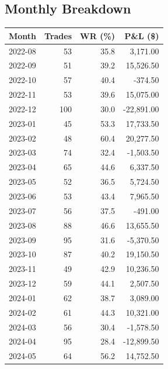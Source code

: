\documentclass[11pt,a4paper,twoside]{article}
\begin{document}
\subsection{Monthly Breakdown}
\noindent\begin{center}
\begin{tabular}{>{\color{txtmain}}l rrr}
\toprule
\rowcolor{cardbg}
\textbf{Month} & \textbf{Trades} & \textbf{WR (\%)} & \textbf{P\&L (\$)} \\
\midrule
2022-08 & 53 & 35.8 & \textcolor{wingreen}{3,171.00} \\
2022-09 & 51 & 39.2 & \textcolor{wingreen}{15,526.50} \\
2022-10 & 57 & 40.4 & \textcolor{lossred}{-374.50} \\
2022-11 & 53 & 39.6 & \textcolor{wingreen}{15,075.00} \\
2022-12 & 100 & 30.0 & \textcolor{lossred}{-22,891.00} \\
2023-01 & 45 & 53.3 & \textcolor{wingreen}{17,733.50} \\
2023-02 & 48 & 60.4 & \textcolor{wingreen}{20,277.50} \\
2023-03 & 74 & 32.4 & \textcolor{lossred}{-1,503.50} \\
2023-04 & 65 & 44.6 & \textcolor{wingreen}{6,337.50} \\
2023-05 & 52 & 36.5 & \textcolor{wingreen}{5,724.50} \\
2023-06 & 53 & 43.4 & \textcolor{wingreen}{7,965.50} \\
2023-07 & 56 & 37.5 & \textcolor{lossred}{-491.00} \\
2023-08 & 88 & 46.6 & \textcolor{wingreen}{13,655.50} \\
2023-09 & 95 & 31.6 & \textcolor{lossred}{-5,370.50} \\
2023-10 & 87 & 40.2 & \textcolor{wingreen}{19,150.50} \\
2023-11 & 49 & 42.9 & \textcolor{wingreen}{10,236.50} \\
2023-12 & 59 & 44.1 & \textcolor{wingreen}{2,507.50} \\
2024-01 & 62 & 38.7 & \textcolor{wingreen}{3,089.00} \\
2024-02 & 61 & 44.3 & \textcolor{wingreen}{10,321.00} \\
2024-03 & 56 & 30.4 & \textcolor{lossred}{-1,578.50} \\
2024-04 & 95 & 28.4 & \textcolor{lossred}{-12,899.50} \\
2024-05 & 64 & 56.2 & \textcolor{wingreen}{14,752.50} \\

\end{tabular}
\end{center}
\end{document}
